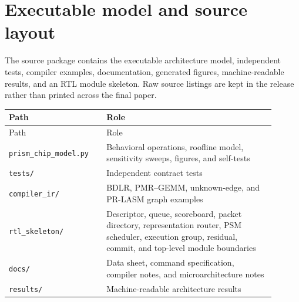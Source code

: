 \documentclass[11pt,oneside,openany]{book}
\theoremstyle{remark}
\begin{document}
\chapter{Executable model and source layout}
The source package contains the executable architecture model, independent tests, compiler examples, documentation, generated figures, machine-readable results, and an RTL module skeleton. Raw source listings are kept in the release rather than printed across the final paper.

\begin{longtable}{L{0.32\linewidth}L{0.58\linewidth}}
\toprule
Path & Role \\
\midrule
\endfirsthead
\toprule
Path & Role \\
\midrule
\endhead
\texttt{prism\_chip\_model.py} & Behavioral operations, roofline model, sensitivity sweeps, figures, and self-tests \\
\texttt{tests/} & Independent contract tests \\
\texttt{compiler\_ir/} & BDLR, PMR--GEMM, unknown-edge, and PR-LASM graph examples \\
\texttt{rtl\_skeleton/} & Descriptor, queue, scoreboard, packet directory, representation router, PSM scheduler, execution group, residual, commit, and top-level module boundaries \\
\texttt{docs/} & Data sheet, command specification, compiler notes, and microarchitecture notes \\
\texttt{results/} & Machine-readable architecture results \\
\bottomrule
\end{longtable}
\end{document}
